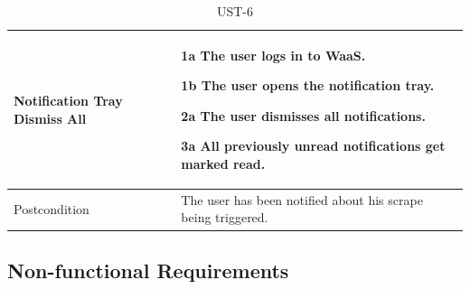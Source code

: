 \documentclass[titlepage, 12pt]{article}
\newenvironment{packed_itemize}{
  \vspace{-\topsep}
  \begin{itemize}
    \setlength{\itemsep}{1pt}
    \setlength{\parskip}{0pt}
    \setlength{\parsep}{0pt}
  }{\end{itemize}}
\begin{document}
\begin{table}[H]
\begin{center}
\begin{tabular}{p{4cm}|p{10cm}}
      Notification Tray Dismiss All &
      \begin{packed_itemize}
        \item [1a] The user logs in to WaaS.
        \item [1b] The user opens the notification tray.
        \item [2a] The user dismisses all notifications.
        \item [3a] All previously unread notifications get marked read.
      \end{packed_itemize}                                                                   \\
      \hline
      Postcondition                 & The user has been notified about his scrape being triggered. \\
    \end{tabular}

    \vspace{-2mm}
    \caption{UST-6}
    \label{table:UST-6}

  \end{center}
\end{table}

\subsection{Non-functional Requirements}
\end{document}
